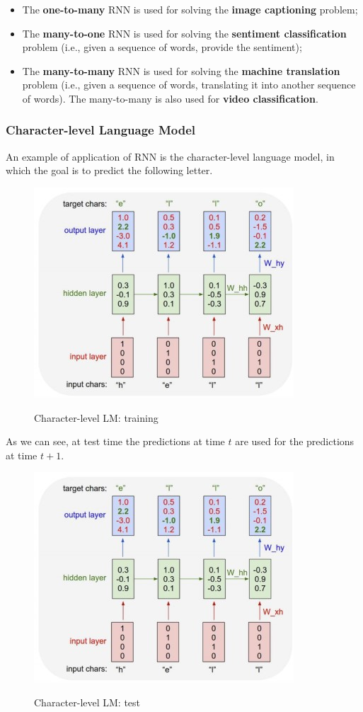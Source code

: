 \begin{itemize}
    \item The \textbf{one-to-many} RNN is used for solving the \textbf{image captioning} problem;
    \item The \textbf{many-to-one} RNN is used for solving the \textbf{sentiment classification} problem (i.e., given a sequence of words, provide the sentiment);
    \item The \textbf{many-to-many} RNN is used for solving the \textbf{machine translation} problem (i.e., given a sequence of words, translating it into another sequence of words). The many-to-many is also used for \textbf{video classification}.
\end{itemize}

\subsubsection{Character-level Language Model}
An example of application of RNN is the character-level language model, in which the goal is to predict the following letter.

\begin{figure}[h!]
		\centering
        \includegraphics[scale = 1.5]{img/example rnn1.jpg}
		\label{mi}
        \caption{Character-level LM: training}
\end{figure}

As we can see, at test time the predictions at time $t$ are used for the predictions at time $t+1$.

\begin{figure}[h!]
		\centering
        \includegraphics[scale = 1.5]{img/example rnn1.jpg}
		\label{mi}
        \caption{Character-level LM: test}
\end{figure}

